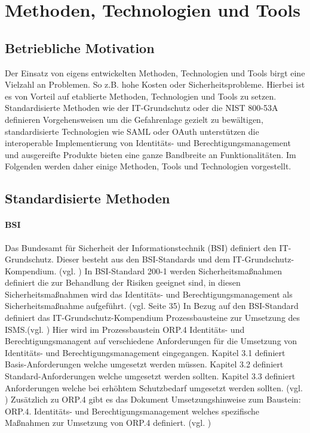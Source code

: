 \documentclass[11pt]{article}
\begin{document}
\section{Methoden, Technologien und Tools}
\label{sec:existing}
\subsection{Betriebliche Motivation}
Der Einsatz von eigens entwickelten Methoden, Technologien und Tools birgt eine Vielzahl an Problemen. So z.B. hohe Kosten oder Sicherheitsprobleme. Hierbei ist es von Vorteil auf etablierte Methoden, Technologien und Tools zu setzen. Standardisierte Methoden wie der IT-Grundschutz oder die NIST 800-53A definieren Vorgehensweisen um die Gefahrenlage gezielt zu bewältigen, standardisierte Technologien wie SAML oder OAuth unterstützen die interoperable Implementierung von Identitäts- und Berechtigungsmanagement und ausgereifte Produkte bieten eine ganze Bandbreite an Funktionalitäten. Im Folgenden werden daher einige Methoden, Tools und Technologien vorgestellt.
\subsection{Standardisierte Methoden}
\paragraph{BSI}
Das Bundesamt für Sicherheit der Informationstechnik (BSI) definiert den IT-Grundschutz. Dieser besteht aus den BSI-Standards und dem IT-Grundschutz-Kompendium. (vgl. \cite{bsi2017grundschutz}) In BSI-Standard 200-1 werden Sicherheitsmaßnahmen definiert die zur Behandlung der Risiken geeignet sind, in diesen Sicherheitsmaßnahmen wird das Identitäts- und Berechtigungsmanagement als Sicherheitsmaßnahme aufgeführt. (vgl. \cite{bsi20172001} Seite 35) In Bezug auf den BSI-Standard definiert das IT-Grundschutz-Kompendium Prozessbausteine zur Umsetzung des ISMS.(vgl. \cite{bsi2023kompendium}) Hier wird im Prozessbaustein \glqq{}ORP.4 Identitäts- und Berechtigungsmanagent\grqq{} auf verschiedene Anforderungen für die Umsetzung von Identitäts- und Berechtigungsmanagement eingegangen. Kapitel 3.1 definiert Basis-Anforderungen welche umgesetzt werden müssen. Kapitel 3.2 definiert Standard-Anforderungen welche umgesetzt werden sollten. Kapitel 3.3 definiert Anforderungen welche bei erhöhtem Schutzbedarf umgesetzt werden sollten. (vgl. \cite{orp4}) Zusätzlich zu ORP.4 gibt es das Dokument \glqq{}Umsetzungshinweise zum Baustein: ORP.4. Identitäts- und Berechtigungsmanagement\grqq{} welches spezifische Maßnahmen zur Umsetzung von ORP.4 definiert. (vgl. \cite{bsi2022umsetzungshinweiseorp4})
\end{document}
